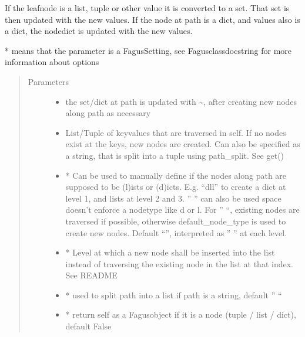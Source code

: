 \documentclass[a4paper,10pt,english]{sphinxmanual}
\begin{document}
\begin{fulllineitems}
\begin{fulllineitems}
\sphinxAtStartPar
If the leaf\sphinxhyphen{}node is a list, tuple or other value it is converted to a set. That set is then updated with the new
values. If the node at path is a dict, and values also is a dict, the node\sphinxhyphen{}dict is updated with the new values.

\sphinxAtStartPar
* means that the parameter is a Fagus\sphinxhyphen{}Setting, see Fagus\sphinxhyphen{}class\sphinxhyphen{}docstring for more information about options
\begin{quote}\begin{description}
\item[{Parameters}] \leavevmode\begin{itemize}
\item {}
\sphinxAtStartPar
{} \textendash{} the set/dict at path is updated with \textasciitilde{}, after creating new nodes along path as necessary

\item {}
\sphinxAtStartPar
{} \textendash{} List/Tuple of key\sphinxhyphen{}values that are traversed in self. If no nodes exist at the keys, new nodes are
created. Can also be specified as a string, that is split into a tuple using path\_split. See get()

\item {}
\sphinxAtStartPar
{} \textendash{} * Can be used to manually define if the nodes along path are supposed to be (l)ists or
(d)icts. E.g. “dll” to create a dict at level 1, and lists at level 2 and 3. ” ” can also be used \sphinxhyphen{}
space doesn’t enforce a node\sphinxhyphen{}type like d or l. For ” “, existing nodes are traversed if possible,
otherwise default\_node\_type is used to create new nodes. Default “”, interpreted as ” ” at each level.

\item {}
\sphinxAtStartPar
{} \textendash{} * Level at which a new node shall be inserted into the list instead of traversing the
existing node in the list at that index. See README

\item {}
\sphinxAtStartPar
{} \textendash{} * used to split path into a list if path is a string, default ” “

\item {}
\sphinxAtStartPar
{} \textendash{} * return self as a Fagus\sphinxhyphen{}object if it is a node (tuple / list / dict), default False


\end{itemize}
\end{description}
\end{quote}
\end{fulllineitems}
\end{fulllineitems}
\end{document}
